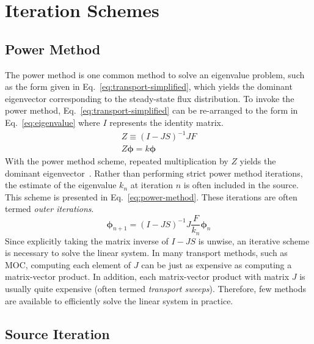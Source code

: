 \section{Iteration Schemes}
\label{sec:moc-iteration-schemes}

\subsection{Power Method}

The power method is one common method to solve an eigenvalue problem, such as the form given in Eq.~\ref{eq:transport-simplified}, which yields the dominant eigenvector corresponding to the steady-state flux distribution. To invoke the power method, Eq.~\ref{eq:transport-simplified} can be re-arranged to the form in Eq.~\ref{eq:eigenvalue} where $I$ represents the identity matrix.
\begin{equation}
\begin{split}
Z \equiv \left(I-JS\right)^{-1} JF \\
Z \boldsymbol{\phi} =  k \boldsymbol{\phi}
\end{split}
\label{eq:eigenvalue}
\end{equation}
With the power method scheme, repeated multiplication by $Z$ yields the dominant eigenvector~\cite{numerical-analysis}. Rather than performing strict power method iterations, the estimate of the eigenvalue $k_n$ at iteration $n$ is often included in the source. This scheme is presented in Eq.~\ref{eq:power-method}. These iterations are often termed \textit{outer iterations}.
\begin{equation}
\boldsymbol{\phi}_{n+1} =  \left(I-JS\right)^{-1} J\frac{F}{k_n} \boldsymbol{\phi}_n
\label{eq:power-method}
\end{equation}
Since explicitly taking the matrix inverse of $I-JS$ is unwise, an iterative scheme is necessary to solve the linear system. In many transport methods, such as \ac{MOC}, computing each element of $J$ can be just as expensive as computing a matrix-vector product. In addition, each matrix-vector product with matrix $J$ is usually quite expensive (often termed \textit{transport sweeps}). Therefore, few methods are available to efficiently solve the linear system in practice. 

\subsection{Source Iteration}

